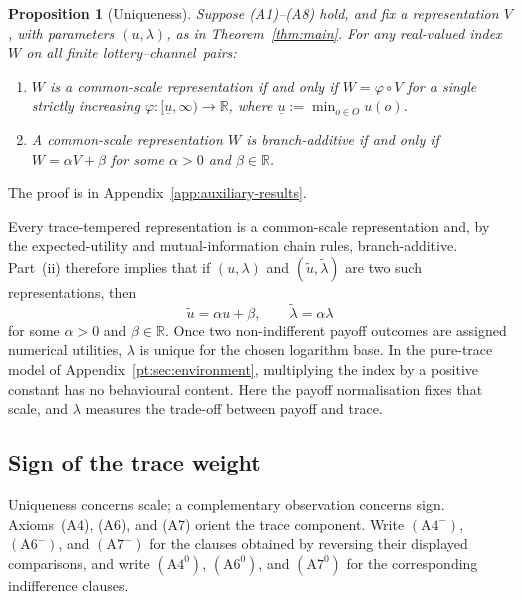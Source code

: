 \documentclass[11pt,a4paper]{article}
\newtheorem{proposition}[theorem]{Proposition}
\theoremstyle{definition}
\newcommand{\1}{\mathbf 1}
\begin{document}
\begin{proposition}[Uniqueness]\label{prop:uniqueness}
Suppose \textup{(A1)--(A8)} hold, and fix a representation $V$, with parameters $(u,\lambda)$, as in
Theorem~\ref{thm:main}.  For any real-valued index $W$ on all finite lottery--channel~pairs:
\begin{enumerate}[label=\textup{(\roman*)},leftmargin=*]
\item $W$ is a common-scale representation if and only if $W=\varphi\circ V$ for a single strictly increasing
$\varphi:[\underline u,\infty)\to\mathbb R$, where $\underline u:=\min_{o\in O}u(o)$.
\item A common-scale representation $W$ is branch-additive if and only if
$W=\alpha V+\beta$ for some $\alpha>0$ and $\beta\in\mathbb R$.
\end{enumerate}
\end{proposition}

The proof is in Appendix~\ref{app:auxiliary-results}.

Every trace-tempered representation is a common-scale representation and, by the expected-utility and
mutual-information chain rules, branch-additive.  Part~\textup{(ii)} therefore implies that if $(u,\lambda)$ and
$(\widetilde u,\widetilde\lambda)$ are two such representations, then
\[
 \widetilde u=\alpha u+\beta,
 \qquad
 \widetilde\lambda=\alpha\lambda
\]
for some $\alpha>0$ and $\beta\in\mathbb R$.  Once two non-indifferent payoff outcomes are assigned numerical
utilities, $\lambda$ is unique for the chosen logarithm base.  In the pure-trace model of
Appendix~\ref{pt:sec:environment}, multiplying the index by a positive constant has no behavioural content.  Here
the payoff normalisation fixes that scale, and $\lambda$ measures the trade-off between payoff and trace.

\subsection{Sign of the trace weight}

Uniqueness concerns scale; a complementary observation concerns sign.  Axioms~\textup{(A4)},
\textup{(A6)}, and \textup{(A7)} orient the trace component.  Write $(\mathrm{A}4^-)$,
$(\mathrm{A}6^-)$, and $(\mathrm{A}7^-)$ for the clauses obtained by reversing their displayed comparisons,
and write $(\mathrm{A}4^0)$, $(\mathrm{A}6^0)$, and $(\mathrm{A}7^0)$ for the corresponding indifference clauses.
\end{document}
